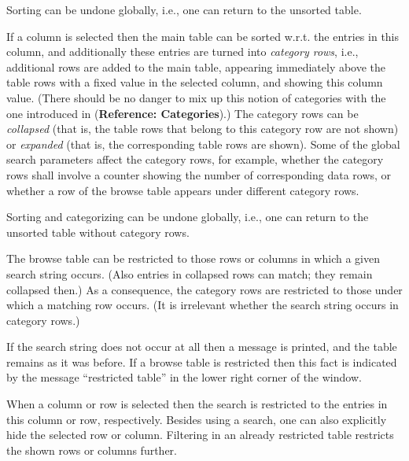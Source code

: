 \documentclass[a4paper,11pt]{report}
\begin{document}
{{\begin{description}
 Sorting can be undone globally, i.{\nobreakspace}e., one can return to the
unsorted table. 
\item[{Sorting and Categorizing:\index{categorizing a browse table}}]  If a column is selected then the main table can be sorted w.r.t. the entries
in this column, and additionally these entries are turned into \emph{category rows}, i.{\nobreakspace}e., additional rows are added to the main table, appearing
immediately above the table rows with a fixed value in the selected column,
and showing this column value. (There should be no danger to mix up this
notion of categories with the one introduced in{\nobreakspace} (\textbf{Reference: Categories}).) The category rows can be \emph{collapsed}  (that is, the table rows that belong to this category row are not shown) or \emph{expanded} (that is, the corresponding table rows are shown). Some of the global search
parameters affect the category rows, for example, whether the category rows
shall involve a counter showing the number of corresponding data rows, or
whether a row of the browse table appears under different category rows. 

  Sorting and categorizing can be undone globally, i.{\nobreakspace}e., one can
return to the unsorted table without category rows. 
\item[{Filtering:\index{filtering a browse table}}]  The browse table can be restricted to those rows or columns in which a given
search string occurs. (Also entries in collapsed rows can match; they remain
collapsed then.) As a consequence, the category rows are restricted to those
under which a matching row occurs. (It is irrelevant whether the search string
occurs in category rows.) 

 If the search string does not occur at all then a message is printed, and the
table remains as it was before. If a browse table is restricted then this fact
is indicated by the message ``restricted table'' in the lower right corner of the window. 

 When a column or row is selected then the search is restricted to the entries
in this column or row, respectively. Besides using a search, one can also
explicitly hide the selected row or column. Filtering in an already restricted
table restricts the shown rows or columns further. 


\end{description}}}
\end{document}
